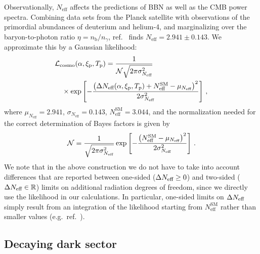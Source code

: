 	Observationally, $N_\text{eff}$ affects the predictions of \ac{BBN} as well as the \ac{CMB} power spectra. Combining data sets from the Planck  satellite with observations of the primordial abundances of deuterium and helium-4, and marginalizing over the baryon-to-photon ratio $\eta = n_\text{b} / n_\gamma$, ref.~\cite{Yeh:2022heq} finds $N_\text{eff} = 2.941 \pm 0.143$. 
	We approximate this by a Gaussian likelihood:
	\begin{align}
		&\mathcal{L}_\text{cosmo}(\alpha, \xi_{\text{p}}, T_{\text{p}}) = \frac{1}{\mathcal{N} \sqrt{2 \pi \sigma_{N_\text{eff}}^2}} \nonumber \\ &\quad \times \exp \left[  - \frac{\left( \Delta N_\text{eff} (\alpha, \xi_{\text{p}}, T_{\text{p}}) + N_\text{eff}^\text{SM} - \mu_{N_\text{eff}} \right)^2}{2 \sigma_{N_\text{eff}}^2}  \right] \, , \label{eq:stableLik}
	\end{align}
	where $\mu_{N_\text{eff}} = 2.941$, $\sigma_{N_\text{eff}} = 0.143$, $N_\text{eff}^\text{SM} = 3.044$, and the normalization needed for the correct determination of Bayes factors is given by
	\begin{align}
		\mathcal{N} = \frac{1}{\sqrt{2  \pi   \sigma_{N_\text{eff}}^2}} \exp \left[  - \frac{\left( N_\text{eff}^\text{SM} - \mu_{N_\text{eff}} \right)^2}{2 \sigma_{N_\text{eff}}^2}  \right]\,.
	\end{align}
	We note that in the above construction we do not have to take into account differences that are reported between one-sided ($\Delta N_\text{eff}  \geq 0$) and two-sided ($\Delta N_\text{eff}  \in \mathbb{R}$) limits on additional radiation degrees of freedom, since we directly use the likelihood in our calculations. In particular, one-sided limits on $\Delta N_\text{eff}  $ simply result from an integration of the likelihood starting from $N_\text{eff}^\text{SM}$ rather than smaller values (e.g.~ref.~\cite{Yeh:2022heq}).
	
	\subsection{Decaying dark sector}
	\label{app:cosmo_decaying_ds}
	
